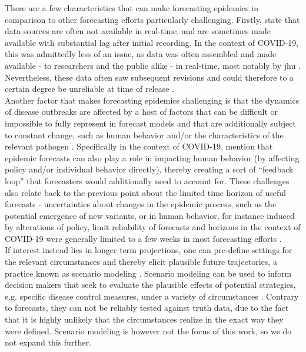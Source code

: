 There are a few characteristics that can make forecasting epidemics in comparison to other forecasting efforts particularly challenging. Firstly, \cite{jajosky_evaluation_2004} state that data sources are often not available in real-time, and are sometimes made available with substantial lag after initial recording. In the context of COVID-19, this was admittedly less of an issue, as data was often assembled and made available - to researchers and the public alike - in real-time, most notably by \ac{jhu} \citep{dong_interactive_2020}. Nevertheless, these data often saw subsequent revisions and could therefore to a certain degree be unreliable at time of release \citep{sherratt_european_2022}.\\
Another factor that makes forecasting epidemics challenging is that the dynamics of disease outbreaks are affected by a host of factors that can be difficult or impossible to fully represent in forecast models and that are additionally subject to constant change, such as human behavior and/or the characteristics of the relevant pathogen \citep{moran_epidemic_2016}. Specifically in the context of COVID-19, \cite{cramer_evaluation_2022} mention that epidemic forecasts can also play a role in impacting human behavior (by affecting policy and/or individual behavior directly), thereby creating a sort of ``feedback loop'' that forecasters would additionally need to account for. These challenges also relate back to the previous point about the limited time horizon of useful forecasts - uncertainties about changes in the epidemic process, such as the potential emergence of new variants, or in human behavior, for instance induced by alterations of policy, limit reliability of forecasts and horizons in the context of COVID-19 were generally limited to a few weeks in most forecasting efforts \citep{reich_collaborative_2022}.\\
If interest instead lies in longer term projections, one can pre-define settings for the relevant circumstances and thereby elicit plausible future trajectories, a practice known as scenario modeling \citep{reich_collaborative_2022}. Scenario modeling can be used to inform decision makers that seek to evaluate the plausible effects of potential strategies, e.g. specific disease control measures, under a variety of circumstances \citep{reich_collaborative_2022}. Contrary to forecasts, they can not be reliably tested against truth data, due to the fact that it is highly unlikely that the circumstances realize in the exact way they were defined. Scenario modeling is however not the focus of this work, so we do not expand this further. \medskip\\
